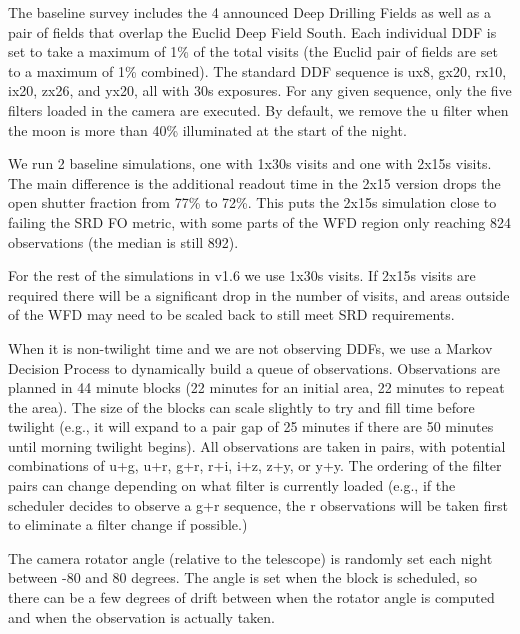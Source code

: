 The baseline survey includes the 4 announced Deep Drilling Fields as well as a pair of fields that overlap the Euclid Deep Field South.  Each individual DDF is set to take a maximum of 1\% of the total visits (the Euclid pair of fields are set to a maximum of 1\% combined). The standard DDF sequence is ux8, gx20, rx10, ix20, zx26, and yx20, all with 30s exposures. For any given sequence, only the five filters loaded in the camera are executed. By default, we remove the u filter when the moon is more than 40\% illuminated at the start of the night. 


We run 2 baseline simulations, one with 1x30s visits and one with 2x15s visits.  The main difference is the additional readout time in the 2x15 version drops the open shutter fraction from 77\% to 72\%. This puts the 2x15s simulation close to failing the SRD FO metric, with some parts of the WFD region only reaching 824 observations (the median is still 892). 

For the rest of the simulations in v1.6 we use 1x30s visits.  If 2x15s visits are required there will be a significant drop in the number of visits, and areas outside of the WFD may need to be scaled back to still meet SRD requirements.

When it is non-twilight time and we are not observing DDFs, we use a Markov Decision Process to dynamically build a queue of observations.  Observations are planned in 44 minute blocks (22 minutes for an initial area, 22 minutes to repeat the area). The size of the blocks can scale slightly to try and fill time before twilight (e.g., it will expand to a pair gap of 25 minutes if there are 50 minutes until morning twilight begins). All observations are taken in pairs, with potential combinations of u+g, u+r, g+r, r+i, i+z, z+y, or y+y. The ordering of the filter pairs can change depending on what filter is currently loaded (e.g., if the scheduler decides to observe a g+r sequence, the r observations will be taken first to eliminate a filter change if possible.)

The camera rotator angle (relative to the telescope) is randomly set each night between -80 and 80 degrees. The angle is set when the block is scheduled, so there can be a few degrees of drift between when the rotator angle is computed and when the observation is actually taken.

